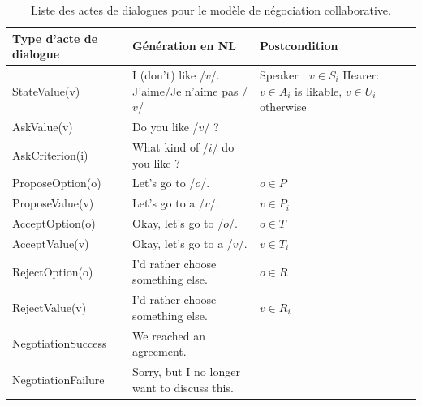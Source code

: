 			\begin{table}[t]
					\centering
					\begin{tabular} {|p{3.25cm}|p{6cm}|p{3.25cm}|}
						\hline
						\textbf{Type d'acte de dialogue}  &\textbf{ Génération en NL} & \textbf{Postcondition}\\
						\hline
						StateValue(v) &  I (don't) like /$v$/. \newline  J'aime/Je n'aime pas /$v$/ & Speaker : $v \in S_i$ \newline Hearer:  \newline $v\in A_i$ is likable, $v\in U_i$ otherwise \\
						\hline
						AskValue(v)& Do you like /$v$/ ? & \multirow{2}{*}{} \\
						
						AskCriterion(i) &  What kind of /$i$/ do you like ? & \\
						\hline
						ProposeOption(o)  & Let's go to /$o$/. & $o \in P$\\
						
						ProposeValue(v) & Let's go to a /$v$/. & $v \in P_i$\\
						\hline
						AcceptOption(o)& Okay, let's go to /$o$/.& $o \in T$ \\
						
						AcceptValue(v) & Okay, let's go to a /$v$/.& $v \in T_i$ \\
						\hline
						RejectOption(o) & I'd rather choose  something else. & $o \in R$\\
						
						RejectValue(v) &  I'd rather choose  something else. & $v \in R_i$ \\
						\hline
						NegotiationSuccess &  We reached an agreement. & \multirow{2}{*}{}\\
						\cline{1-2}
						NegotiationFailure &  Sorry, but I no longer want to discuss this. & \\
						\hline
					\end{tabular}
				
				\caption{\label{table:utt}Liste des actes de dialogues pour le modèle de négociation collaborative.}
			\end{table}
		
